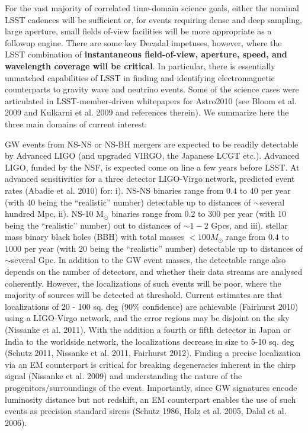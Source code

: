 \documentclass [11pt]{article}
\begin{document}
For the vast majority of correlated time-domain science goals, either the nominal LSST cadences will be sufficient or, for events requiring dense and deep sampling, large aperture, small fields of-view facilities will be more appropriate as a followup engine. There are some key Decadal impetuses, however, where the LSST combination of {\bf instantaneous field-of-view, aperture, speed, and wavelength coverage will be critical}. In particular, there is essentially unmatched capabilities of LSST in finding and identifying electromagnetic counterparts to gravity wave and neutrino events. Some of the science cases were articulated in LSST-member-driven whitepapers for Astro2010 (see Bloom et al. 2009 and Kulkarni et al. 2009 and references therein). We summarize here the three main domains of current interest:

\medskip

 GW events from NS-NS or NS-BH mergers are expected to be readily detectable by Advanced LIGO (and upgraded VIRGO, the Japanese LCGT etc.). Advanced LIGO, funded by the NSF, is expected come on line a few years before LSST. At advanced sensitivities for a three detector LIGO-Virgo network, predicted event rates (Abadie et al. 2010) 
for: i). NS-NS binaries range from $0.4$ to $40$ per year (with 40 being the ``realistic'' number) detectable up to distances of
$\sim$several hundred Mpc, ii). NS-10 M$_{\odot}$ binaries range from $0.2$ to $300$ per year (with 10 being the ``realistic'' number) out to distances of $\sim 1-2$ Gpcs, and iii). stellar mass binary black holes (BBH) with total masses $<100 M_{\odot}$ range from $0.4$ to $1000$ per year (with 20 being the ``realistic'' number) detectable up to distances of $\sim$several Gpc. In addition to the GW event masses, the detectable range also depends on the number of detectors, and whether their data streams are analysed coherently. However, the localizations of such events will be poor, where the majority of sources will be detected at threshold. Current estimates are that localizations of 20 - 100 sq. deg (90\% confidence) are achievable (Fairhurst 2010) using a LIGO-Virgo network, and the error regions may be disjoint on the sky (Nissanke et al. 2011). With the addition a fourth or fifth detector in Japan or India to the worldside network, the localizations decrease in size to 5-10 sq. deg (Schutz 2011, Nissanke et al. 2011, Fairhurst 2012). Finding a precise localization via an EM counterpart is critical for breaking degeneracies inherent in the chirp signal (Nissanke et al. 2009) and understanding the nature of the progenitors/surroundings of the event. Importantly, since GW signatures encode luminosity distance but not redshift, an EM counterpart enables the use of such events as precision standard sirens (Schutz 1986, Holz et al. 2005, Dalal et al. 2006). 
\end{document}
